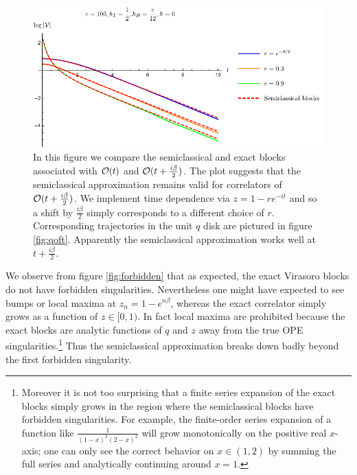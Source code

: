 \begin{figure}[t]
\hfill\includegraphics[]{virasoro_chapter/BetaOver2SemiClassical}
\caption{In this figure we compare the semiclassical and exact blocks associated with ${\cal O}(t)$ and ${\cal O}(t + \frac{i \beta}{2})$.  The plot suggests that the semiclassical approximation remains valid for correlators of ${\cal O}(t + \frac{i \beta}{2})$.  We implement time dependence via $z = 1 - r e^{-it}$ and so a shift by $\frac{i \beta}{2}$ simply corresponds to a different choice of $r$.  Corresponding trajectories in the unit $q$ disk are pictured in figure \ref{fig:qoft}.   Apparently the semiclassical approximation works well at $t + \frac{i \beta}{2}$.   }
\label{fig:betaover2}
\end{figure}


We observe from figure \ref{fig:forbidden} that as expected, the exact Virasoro blocks do not have forbidden singularities.  Nevertheless one might have expected to see bumps or local maxima at $z_n = 1 - e^{n \beta}$, whereas the exact correlator simply grows as a function of $z \in [0,1)$.  In fact local maxima are prohibited because the exact blocks are analytic functions of $q$ and $z$ away from the true OPE singularities.\footnote{Moreover it is not too surprising that a finite series expansion of the exact blocks simply grows in the region where the semiclassical blocks have forbidden singularities.  For example, the finite-order series expansion of a function like $\frac{1}{(1-x)^2(2-x)^2}$ will grow monotonically on the positive real $x$-axis; one can only see the correct behavior on $x \in (1,2)$ by summing the full series and analytically continuing around $x=1$.}  Thus the semiclassical approximation breaks down badly beyond the first forbidden singularity. 


